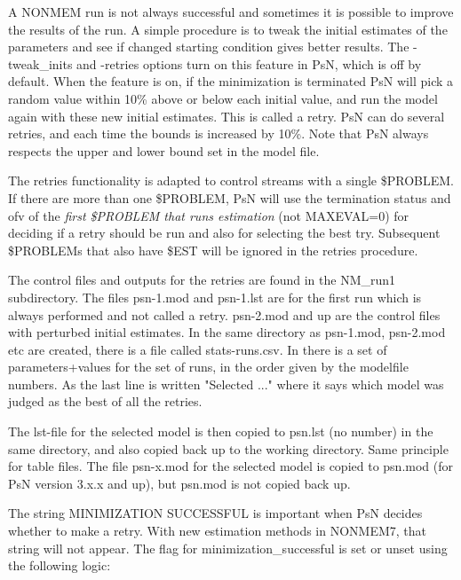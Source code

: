 A NONMEM run is not always successful and sometimes it is possible to improve the results of the run. 
A simple procedure is to tweak the initial 
estimates of the parameters and see if changed starting condition gives better results. 
The -tweak\_inits and -retries options turn on this feature in PsN, 
which is off by default. When the feature is on, if the minimization is terminated PsN will pick a random value within 10\% above or below each initial value, 
and run the model again with these new initial estimates. This is called a retry. PsN can do several retries, and each time the bounds is 
increased by 10\%. Note that PsN always respects the upper and lower bound set in the model file. 

The retries functionality is adapted to control streams with a single \$PROBLEM. If there are more than one \$PROBLEM, PsN will
use the termination status and ofv of the \emph{first \$PROBLEM that runs estimation} (not MAXEVAL=0) for deciding if a retry should be run
and also for selecting the best try. Subsequent \$PROBLEMs that also have \$EST will be ignored in the retries procedure.

The control files and outputs for the retries are found in the NM\_run1 subdirectory. The files psn-1.mod and psn-1.lst are for 
the first run which is always performed and not called a retry. psn-2.mod and up are the control files with perturbed initial 
estimates. In the same directory as psn-1.mod, psn-2.mod etc are created, there is a file called stats-runs.csv. In there is a 
set of parameters+values for the set of runs, in the order given by the modelfile numbers. As the last line is 
written "Selected ..." where it says which model was judged as the best of all the retries.

The lst-file for the selected model is then copied to psn.lst (no number) in the same directory, and also copied back 
up to the working directory. Same principle for table files. The file psn-x.mod for the selected model is copied 
to psn.mod (for PsN version 3.x.x and up), but psn.mod is not copied back up.   	

The string MINIMIZATION SUCCESSFUL is important when PsN decides whether to make a retry. With new estimation 
methods in NONMEM7, that string will not appear. The flag for minimization\_successful is set or unset using the following logic:

